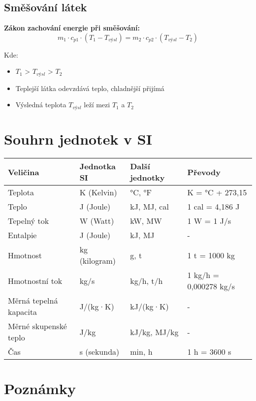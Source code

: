 \documentclass[11pt,a4paper]{article}
\begin{document}
\subsection{Směšování látek}

\textbf{Zákon zachování energie při směšování:}
\[m_1 \cdot c_{p1} \cdot (T_1 - T_{výsl}) = m_2 \cdot c_{p2} \cdot (T_{výsl} - T_2)\]

Kde:
\begin{itemize}
\item $T_1$ > $T_{výsl}$ > $T_2$
\item Teplejší látka odevzdává teplo, chladnější přijímá
\item Výsledná teplota $T_{výsl}$ leží mezi $T_1$ a $T_2$
\end{itemize}

\clearpage

\section{Souhrn jednotek v SI}

\begin{longtable}{llll}
\toprule
Veličina & Jednotka SI & Další jednotky & Převody \\
\midrule
Teplota & K (Kelvin) & °C, °F & K = °C + 273,15 \\
Teplo & J (Joule) & kJ, MJ, cal & 1 cal = 4,186 J \\
Tepelný tok & W (Watt) & kW, MW & 1 W = 1 J/s \\
Entalpie & J (Joule) & kJ, MJ & - \\
Hmotnost & kg (kilogram) & g, t & 1 t = 1000 kg \\
Hmotnostní tok & kg/s & kg/h, t/h & 1 kg/h = 0,000278 kg/s \\
Měrná tepelná kapacita & J/(kg·K) & kJ/(kg·K) & - \\
Měrné skupenské teplo & J/kg & kJ/kg, MJ/kg & - \\
Čas & s (sekunda) & min, h & 1 h = 3600 s \\
\bottomrule
\end{longtable}

\clearpage

\section*{Poznámky}
\end{document}
